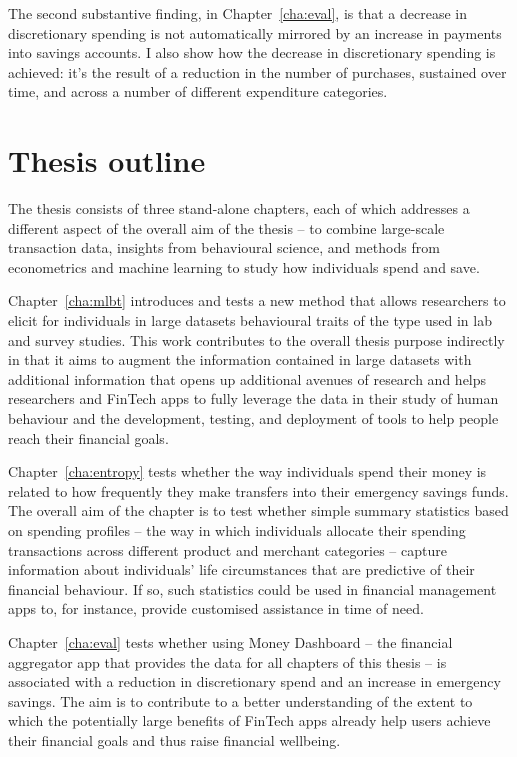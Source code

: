 The second substantive finding, in Chapter~\ref{cha:eval}, is that a decrease in discretionary spending is not automatically mirrored by an increase in payments into savings accounts. I also show how the decrease in discretionary spending is achieved: it's the result of a reduction in the number of purchases, sustained over time, and across a number of different expenditure categories.


\section{Thesis outline}%

The thesis consists of three stand-alone chapters, each of which addresses a
different aspect of the overall aim of the thesis -- to combine large-scale
transaction data, insights from behavioural science, and methods from
econometrics and machine learning to study how individuals spend and save. 

Chapter~\ref{cha:mlbt} introduces and tests a new method that allows
researchers to elicit for individuals in large datasets behavioural traits of the type used in lab and survey
studies. This work contributes to the overall
thesis purpose indirectly in that it aims to augment the information contained
in large datasets with additional information that opens up additional avenues
of research and helps researchers and FinTech apps to fully leverage the data in their study of
human behaviour and the development, testing, and deployment of tools to help people reach their financial goals.

Chapter~\ref{cha:entropy} tests whether the way individuals spend their money
is related to how frequently they make transfers into their emergency savings
funds. The overall aim of the chapter is to test whether simple summary
statistics based on spending profiles -- the way in which individuals
allocate their spending transactions across different product and merchant
categories -- capture information about individuals' life circumstances that
are predictive of their financial behaviour. If so, such statistics could be
used in financial management apps to, for instance, provide customised assistance in time of need.

Chapter~\ref{cha:eval} tests whether using Money Dashboard -- the financial
aggregator app that provides the data for all chapters of this thesis -- is
associated with a reduction in discretionary spend and an increase in emergency
savings. The aim is to contribute to a better understanding of the extent to
which the potentially large benefits of FinTech apps already help users achieve
their financial goals and thus raise financial wellbeing.

